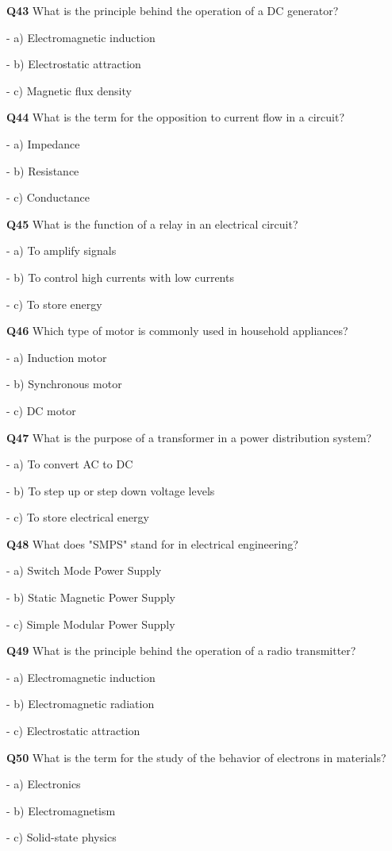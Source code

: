 \textbf{Q43} What is the principle behind the operation of a DC generator?\par
\quad - a) Electromagnetic induction\par
\quad - b) Electrostatic attraction\par
\quad - c) Magnetic flux density\par

\textbf{Q44} What is the term for the opposition to current flow in a circuit?\par
\quad - a) Impedance\par
\quad - b) Resistance\par
\quad - c) Conductance\par

\textbf{Q45} What is the function of a relay in an electrical circuit?\par
\quad - a) To amplify signals\par
\quad - b) To control high currents with low currents\par
\quad - c) To store energy\par

\textbf{Q46} Which type of motor is commonly used in household appliances?\par
\quad - a) Induction motor\par
\quad - b) Synchronous motor\par
\quad - c) DC motor\par

\textbf{Q47} What is the purpose of a transformer in a power distribution system?\par
\quad - a) To convert AC to DC\par
\quad - b) To step up or step down voltage levels\par
\quad - c) To store electrical energy\par

\textbf{Q48} What does "SMPS" stand for in electrical engineering?\par
\quad - a) Switch Mode Power Supply\par
\quad - b) Static Magnetic Power Supply\par
\quad - c) Simple Modular Power Supply\par

\textbf{Q49} What is the principle behind the operation of a radio transmitter?\par
\quad - a) Electromagnetic induction\par
\quad - b) Electromagnetic radiation\par
\quad - c) Electrostatic attraction\par

\textbf{Q50} What is the term for the study of the behavior of electrons in materials?\par
\quad - a) Electronics\par
\quad - b) Electromagnetism\par
\quad - c) Solid-state physics\par